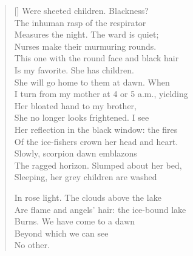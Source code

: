 \begin{verse}[\versewidth]
Were sheeted children. Blackness?\\
The inhuman rasp of the respirator\\
Measures the night. The ward is quiet;\\
Nurses make their murmuring rounds.\\
This one with the round face and black hair\\
Is my favorite. She has children.\\
She will go home to them at dawn. When\\
I turn from my mother at 4 or 5 a.m., yielding\\
Her bloated hand to my brother,\\
She no longer looks frightened. I see\\
Her reflection in the black window: the fires\\
Of the ice-fishers crown her head and heart.\\
Slowly, scorpion dawn emblazons\\
The ragged horizon. Slumped about her bed,\\
Sleeping, her grey children are washed

In rose light. The clouds above the lake\\
Are flame and angels' hair: the ice-bound lake\\
Burns. We have come to a dawn\\
Beyond which we can see\\
No other.
\end{verse}